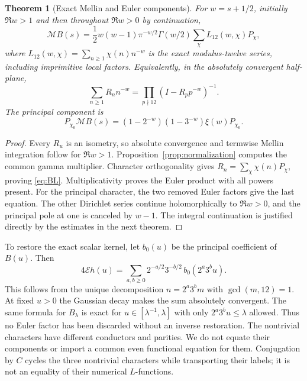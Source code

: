 \documentclass[11pt,reqno]{amsart}
\newtheorem{theorem}{Theorem}[section]
\theoremstyle{definition}\newtheorem{definition}[theorem]{Definition}
\theoremstyle{remark}\newtheorem{remark}[theorem]{Remark}
\newcommand{\M}{\mathcal M}\newcommand{\K}{\mathcal K}\newcommand{\E}{\mathcal E}
\begin{document}
\begin{theorem}[Exact Mellin and Euler components]\label{thm:dirichlet}
For $w=s+1/2$, initially $\Re w>1$ and then throughout $\Re w>0$ by continuation,
\begin{equation}\label{eq:BL}
\M B(s)=\frac12w(w-1)\pi^{-w/2}\Gamma(w/2)
\sum_{\chi}L_{12}(w,\chi)P_\chi,
\end{equation}
where $L_{12}(w,\chi)=\sum_{n\ge1}\chi(n)n^{-w}$ is the exact modulus-twelve series, including imprimitive local factors. Equivalently, in the absolutely convergent half-plane,
\[
\sum_{n\ge1}R_nn^{-w}=\prod_{p\nmid12}(I-R_p p^{-w})^{-1}.
\]
The principal component is
\[
P_{\chi_0}\M B(s)=(1-2^{-w})(1-3^{-w})\xi(w)P_{\chi_0}.
\]
\end{theorem}
\begin{proof}
Every $R_u$ is an isometry, so absolute convergence and termwise Mellin integration follow for $\Re w>1$. Proposition~\ref{prop:normalization} computes the common gamma multiplier. Character orthogonality gives $R_n=\sum_\chi\chi(n)P_\chi$, proving \eqref{eq:BL}. Multiplicativity proves the Euler product with all powers present. For the principal character, the two removed Euler factors give the last equation. The other Dirichlet series continue holomorphically to $\Re w>0$, and the principal pole at one is canceled by $w-1$. The integral continuation is justified directly by the estimates in the next theorem.
\end{proof}
To restore the exact scalar kernel, let $b_0(u)$ be the principal coefficient of $B(u)$. Then
\begin{equation}\label{eq:restore}
4\E h(u)=\sum_{a,b\ge0}2^{-a/2}3^{-b/2}\,
 b_0(2^a3^b u).
\end{equation}
This follows from the unique decomposition $n=2^a3^bm$ with $\gcd(m,12)=1$. At fixed $u>0$ the Gaussian decay makes the sum absolutely convergent. The same formula for $B_\lambda$ is exact for $u\in[\lambda^{-1},\lambda]$ with only $2^a3^bu\le\lambda$ allowed. Thus no Euler factor has been discarded without an inverse restoration.
The nontrivial characters have different conductors and parities. We do not equate their components or import a common even functional equation for them. Conjugation by $C$ cycles the three nontrivial characters while transporting their labels; it is not an equality of their numerical $L$-functions.
\end{document}
